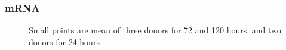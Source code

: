 \documentclass[
  letterpaper,
  DIV=11,
  numbers=noendperiod,
  oneside]{scrartcl}
\begin{document}
\begin{figure}


\caption{\label{fig-morph}}

\end{figure}%

\subsubsection{mRNA}\label{mrna}

\begin{figure}[H]


\caption{\label{fig-mrna-3a4-il6}Small points are mean of three donors
for 72 and 120 hours, and two donors for 24 hours}

\end{figure}%
\end{document}
